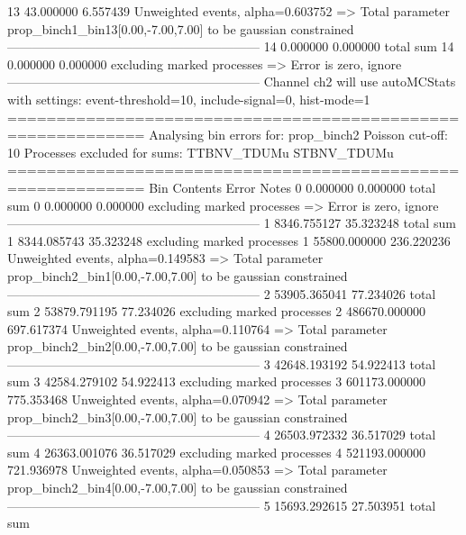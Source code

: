 13         43.000000       6.557439        Unweighted events, alpha=0.603752
  => Total parameter prop_binch1_bin13[0.00,-7.00,7.00] to be gaussian constrained
------------------------------------------------------------
14         0.000000        0.000000        total sum                     
14         0.000000        0.000000        excluding marked processes    
  => Error is zero, ignore      
------------------------------------------------------------
Channel ch2 will use autoMCStats with settings: event-threshold=10, include-signal=0, hist-mode=1
============================================================
Analysing bin errors for: prop_binch2
Poisson cut-off: 10
Processes excluded for sums: TTBNV_TDUMu STBNV_TDUMu
============================================================
Bin        Contents        Error           Notes                         
0          0.000000        0.000000        total sum                     
0          0.000000        0.000000        excluding marked processes    
  => Error is zero, ignore      
------------------------------------------------------------
1          8346.755127     35.323248       total sum                     
1          8344.085743     35.323248       excluding marked processes    
1          55800.000000    236.220236      Unweighted events, alpha=0.149583
  => Total parameter prop_binch2_bin1[0.00,-7.00,7.00] to be gaussian constrained
------------------------------------------------------------
2          53905.365041    77.234026       total sum                     
2          53879.791195    77.234026       excluding marked processes    
2          486670.000000   697.617374      Unweighted events, alpha=0.110764
  => Total parameter prop_binch2_bin2[0.00,-7.00,7.00] to be gaussian constrained
------------------------------------------------------------
3          42648.193192    54.922413       total sum                     
3          42584.279102    54.922413       excluding marked processes    
3          601173.000000   775.353468      Unweighted events, alpha=0.070942
  => Total parameter prop_binch2_bin3[0.00,-7.00,7.00] to be gaussian constrained
------------------------------------------------------------
4          26503.972332    36.517029       total sum                     
4          26363.001076    36.517029       excluding marked processes    
4          521193.000000   721.936978      Unweighted events, alpha=0.050853
  => Total parameter prop_binch2_bin4[0.00,-7.00,7.00] to be gaussian constrained
------------------------------------------------------------
5          15693.292615    27.503951       total sum                     
